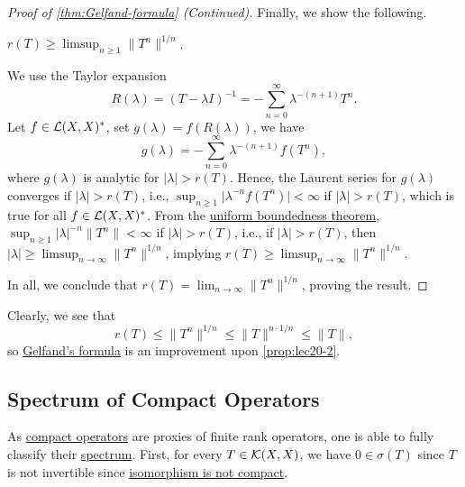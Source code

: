 \begin{proof}[Proof of \autoref{thm:Gelfand-formula} (Continued)]
	Finally, we show the following.
	\begin{claim}
		\(r(T) \geq \limsup_{n \geq 1} \lVert T^n \rVert ^{1 / n} \).
	\end{claim}
	\begin{explanation}
		We use the Taylor expansion
		\[
			R(\lambda ) = (T - \lambda I)^{-1} = - \sum_{n=0}^{\infty} \lambda ^{-(n+1)}T^n.
		\]
		Let \(f\in \mathcal{\MakeUppercase{l}} (X, X)^{\ast} \), set \(g(\lambda ) = f(R(\lambda ))\), we have
		\[
			g(\lambda ) = - \sum_{n=0}^{\infty} \lambda ^{-(n+1)} f(T^n),
		\]
		where \(g(\lambda )\) is analytic for \(\vert \lambda  \vert > r(T)\). Hence, the Laurent series for \(g(\lambda )\) converges if \(\vert \lambda  \vert > r(T)\), i.e., \(\sup _{n\geq 1} \vert \lambda ^{-n} f(T^n) \vert < \infty\) if \(\vert \lambda  \vert > r(T)\), which is true for all \(f\in \mathcal{\MakeUppercase{l}} (X, X)^{\ast} \). From the \hyperref[thm:uniform-boundedness]{uniform boundedness theorem}, \(\sup _{n\geq 1} \vert \lambda  \vert^{-n} \lVert T^n \rVert < \infty\) if \(\vert \lambda  \vert > r(T) \), i.e., if \(\vert \lambda  \vert > r(T) \), then \(\vert \lambda \vert \geq \limsup_{n \to \infty} \lVert T^n \rVert ^{1 / n}\), implying \(r(T) \geq \limsup_{n \to \infty} \lVert T^n \rVert ^{1 / n}\).
	\end{explanation}

	In all, we conclude that \(r(T) = \lim_{n \to \infty} \lVert T^n \rVert ^{1 / n}\), proving the result.
\end{proof}

Clearly, we see that
\[
	r(T) \leq \lVert T^n \rVert ^{1 / n} \leq \lVert T \rVert ^{n\cdot 1 / n} \leq \lVert T \rVert,
\]
so \hyperref[thm:Gelfand-formula]{Gelfand's formula} is an improvement upon \autoref{prop:lec20-2}.

\subsection{Spectrum of Compact Operators}
As \hyperref[def:compact-op]{compact operators} are proxies of finite rank operators, one is able to fully classify their \hyperref[def:spectrum-point]{spectrum}. First, for every \(T\in \mathcal{\MakeUppercase{k}} (X, X)\), we have \(0\in \sigma (T)\) since \(T\) is not invertible since \hyperref[col:iso-are-not-compact]{isomorphism is not compact}.

